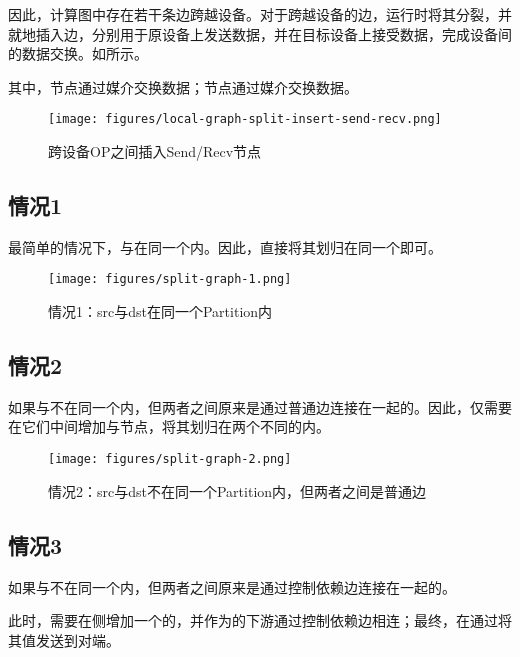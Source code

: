 因此，计算图中存在若干条边跨越设备。对于跨越设备的边，运行时将其分裂，并就地插入边，分别用于原设备上发送数据，并在目标设备上接受数据，完成设备间的数据交换。如所示。

其中，节点通过媒介交换数据；节点通过媒介交换数据。

\begin{figure}[H]
\centering
\texttt{[image: figures/local-graph-split-insert-send-recv.png]}
\caption{跨设备OP之间插入Send/Recv节点}
 \label{fig:local-graph-split-insert-send-recv}
\end{figure}

\subsection{情况1}

最简单的情况下，与在同一个内。因此，直接将其划归在同一个即可。

\begin{figure}[H]
\centering
\texttt{[image: figures/split-graph-1.png]}
\caption{情况1：src与dst在同一个Partition内}
 \label{fig:split-graph-1}
\end{figure}

\subsection{情况2}

如果与不在同一个内，但两者之间原来是通过普通边连接在一起的。因此，仅需要在它们中间增加与节点，将其划归在两个不同的内。

\begin{figure}[H]
\centering
\texttt{[image: figures/split-graph-2.png]}
\caption{情况2：src与dst不在同一个Partition内，但两者之间是普通边}
 \label{fig:split-graph-2}
\end{figure}

\subsection{情况3}

如果与不在同一个内，但两者之间原来是通过控制依赖边连接在一起的。

此时，需要在侧增加一个的，并作为的下游通过控制依赖边相连；最终，在通过将其值发送到对端。

